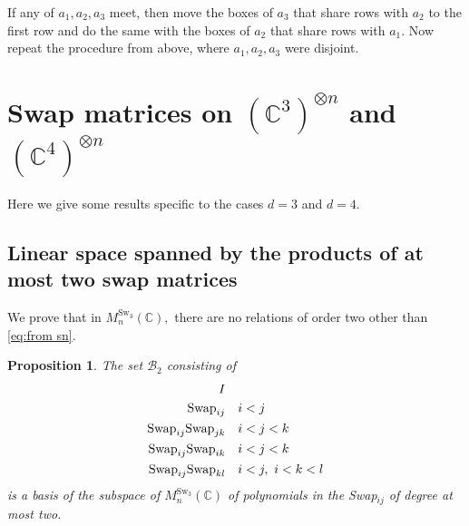 \documentclass[12pt,dvipsnames,accepted=2016-08-18,a4paper,onecolumn]{quantumarticle}
\numberwithin{equation}{section}
\newcommand{\CC}{\mathbb C}
\newtheorem{proposition}[theorem]{Proposition}
\theoremstyle{definition}
\begin{document}
If any of  $a_1,a_2,a_3$ meet, then move the boxes of $a_3$ that share rows with $a_2$ to the first row and do the same with the boxes of $a_2$ that share rows with $a_1.$ Now repeat the procedure from above, where $a_1,a_2,a_3$ were disjoint.













 \section{Swap matrices on $(\CC^3)^{\otimes n}$ and $(\CC^4)^{\otimes n}$}\label{a:3and4}

Here we give some results specific to the cases $d=3$ and $d=4$.
 
\subsection{Linear space spanned by the products of at most two swap matrices}\label{a:d3l2}

We prove that in $M^{\text{Sw}_3}_n(\mathbb{C}),$ there are no relations of order two other than \eqref{eq:from sn}.

\begin{proposition}\label{propo: 2-indep}
	The set $\mathcal{B}_2$ consisting of
	\begin{align*}
		I& \\
		\textnormal{Swap}_{ij}& \quad i < j\\
		\textnormal{Swap}_{ij} \textnormal{Swap}_{jk}& \quad i < j < k\\
		\textnormal{Swap}_{ij} \textnormal{Swap}_{ik}& \quad i < j < k\\
		\textnormal{Swap}_{ij} \textnormal{Swap}_{kl}& \quad i < j, \  i < k < l
	\end{align*}
is a basis of the subspace of $M^{\text{Sw}_3}_n(\mathbb{C})$ of polynomials in the Swap$_{ij}$ of degree at most two.
\end{proposition}
\end{document}
